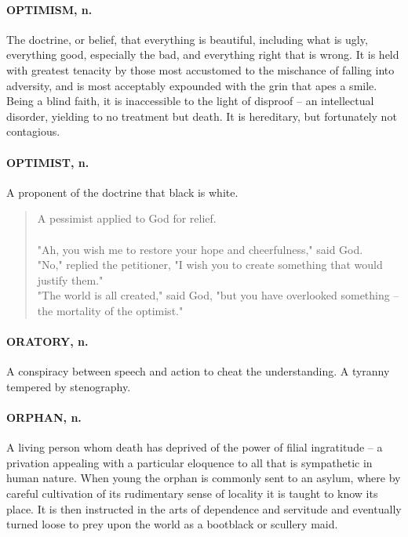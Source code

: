 \documentclass[11pt]{article}
\begin{document}
\paragraph{OPTIMISM, n.}  The doctrine, or belief, that everything is beautiful,
including what is ugly, everything good, especially the bad, and
everything right that is wrong.  It is held with greatest tenacity by
those most accustomed to the mischance of falling into adversity, and
is most acceptably expounded with the grin that apes a smile.  Being a
blind faith, it is inaccessible to the light of disproof -- an
intellectual disorder, yielding to no treatment but death.  It is
hereditary, but fortunately not contagious.

\paragraph{OPTIMIST, n.}  A proponent of the doctrine that black is white.
\begin{quote}   A pessimist applied to God for relief.\\
  \\
  "Ah, you wish me to restore your hope and cheerfulness," said God.\\
  "No," replied the petitioner, "I wish you to create something that
would justify them." \\
   "The world is all created," said God, "but you have overlooked
something -- the mortality of the optimist."
\end{quote}

\paragraph{ORATORY, n.}  A conspiracy between speech and action to cheat the
understanding.  A tyranny tempered by stenography.

\paragraph{ORPHAN, n.}  A living person whom death has deprived of the power of
filial ingratitude -- a privation appealing with a particular
eloquence to all that is sympathetic in human nature.  When young the
orphan is commonly sent to an asylum, where by careful cultivation of
its rudimentary sense of locality it is taught to know its place.  It
is then instructed in the arts of dependence and servitude and
eventually turned loose to prey upon the world as a bootblack or
scullery maid.
\end{document}
